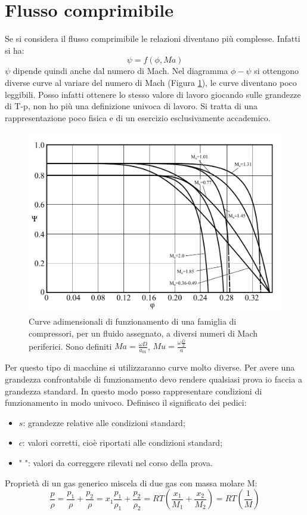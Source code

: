 \section{Flusso comprimibile}
Se si considera il flusso comprimibile le relazioni diventano più complesse. Infatti si ha:
\begin{equation}
\psi=f(\phi,Ma)
\end{equation}
$\psi$ dipende quindi anche dal numero di Mach. 
Nel diagramma $\phi-\psi$ si ottengono diverse curve al variare del numero di Mach (Figura \ref{fig:ComprMach}), le curve diventano poco leggibili. Posso infatti ottenere lo stesso valore di lavoro giocando sulle grandezze di T-p, non ho più una definizione univoca di lavoro. Si tratta di una rappresentazione poco fisica e di un esercizio esclusivamente accademico.
\begin{figure}[h!]
\centering
  \includegraphics[width=.5\textwidth]{fig/ComprMach.pdf}
\caption{Curve adimensionali di funzionamento di una famiglia di compressori, per un fluido assegnato, a diversi numeri di Mach periferici. Sono definiti $Ma = \frac{\omega D}{a_{01}}$, $Mu = \frac{\omega \frac{D}{2}}{a}$}
\label{fig:ComprMach}
\end{figure}
Per questo tipo di macchine si utilizzaranno curve molto diverse. Per avere una grandezza confrontabile di funzionamento devo rendere qualsiasi prova io faccia a grandezza standard. In questo modo posso rappresentare condizioni di funzionamento in modo univoco. 
Definisco il significato dei pedici:
\begin{itemize}
\item $s$: grandezze relative alle condizioni standard;
\item $c$: valori corretti, cioè riportati alle condizioni standard;
\item "  ": valori da correggere rilevati nel corso della prova.
\end{itemize}
Proprietà di un gas generico miscela di due gas con massa molare M:
\begin{equation}
\frac{p}{\rho} = \frac{p_1}{\rho} + \frac{p_2}{\rho} = x_1  \frac{p_1}{\rho_1} + \frac{p_2}{\rho_2} = RT \left( \frac{x_1}{M_1} + \frac{x_2}{M_2} \right) = RT(\frac{1}{M})
\end{equation}
